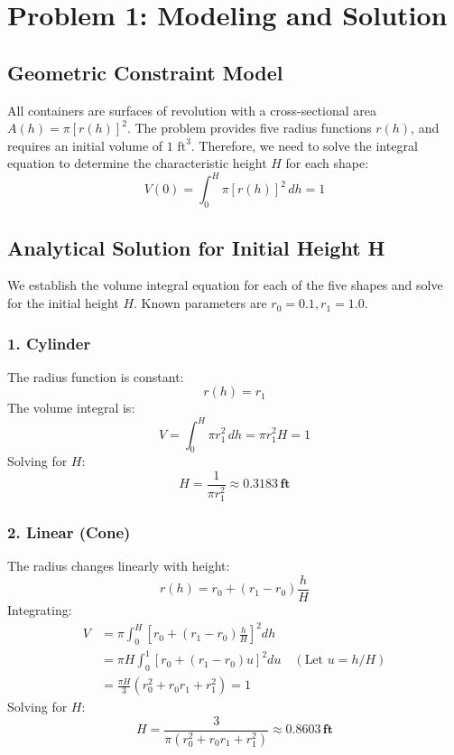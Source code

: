 \documentclass[a4paper, 12pt]{article}
\begin{document}
\section{Problem 1: Modeling and Solution}

\subsection{Geometric Constraint Model}
All containers are surfaces of revolution with a cross-sectional area $A(h) = \pi [r(h)]^2$. The problem provides five radius functions $r(h)$, and requires an initial volume of $1 \text{ ft}^3$. Therefore, we need to solve the integral equation to determine the characteristic height $H$ for each shape:
\begin{equation}
    V(0) = \int_0^H \pi [r(h)]^2 \, dh = 1
\end{equation}

\subsection{Analytical Solution for Initial Height H}
We establish the volume integral equation for each of the five shapes and solve for the initial height $H$. Known parameters are $r_0 = 0.1, r_1 = 1.0$.

\subsubsection*{1. Cylinder}
The radius function is constant:
\begin{equation}
    r(h) = r_1
\end{equation}
The volume integral is:
\begin{equation}
    V = \int_0^H \pi r_1^2 \, dh = \pi r_1^2 H = 1
\end{equation}
Solving for $H$:
\begin{equation}
    H = \frac{1}{\pi r_1^2} \approx \mathbf{0.3183 \, \text{ft}}
\end{equation}

\subsubsection*{2. Linear (Cone)}
The radius changes linearly with height:
\begin{equation}
    r(h) = r_0 + (r_1 - r_0)\frac{h}{H}
\end{equation}
Integrating:
\begin{align}
    V &= \pi \int_0^H \left[ r_0 + (r_1 - r_0)\frac{h}{H} \right]^2 dh \nonumber \\
      &= \pi H \int_0^1 \left[ r_0 + (r_1 - r_0)u \right]^2 du \quad (\text{Let } u = h/H) \nonumber \\
      &= \frac{\pi H}{3} (r_0^2 + r_0 r_1 + r_1^2) = 1
\end{align}
Solving for $H$:
\begin{equation}
    H = \frac{3}{\pi (r_0^2 + r_0r_1 + r_1^2)}  \approx \mathbf{0.8603 \, \text{ft}}
\end{equation}
\end{document}
